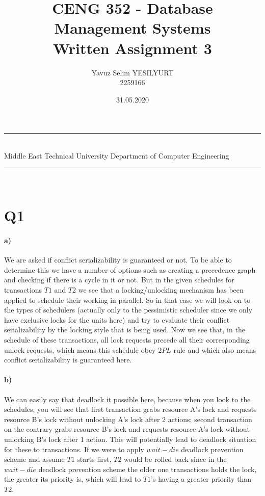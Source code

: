 \documentclass[a4paper,12pt]{article}
\title{CENG 352 - Database Management Systems \\ Written Assignment 3}
\author{Yavuz Selim YESILYURT \\ 2259166} %
\date{31.05.2020}
\newcommand{\HRule}{\rule{\linewidth}{1mm}}
\begin{document}
\HRule\\
Middle East Technical University \hfill Department of Computer Engineering
{\let\newpage\relax\maketitle}
\HRule\\
\vspace{1cm}


\section{Q1}

\paragraph{a)} We are asked if conflict serializability is guaranteed or not. To be able to determine this we have a number of options such as creating a precedence graph and checking if there is a cycle in it or not. But in the given schedules for transactions $T1$ and $T2$ we see that a locking/unlocking mechanism has been applied to schedule their working in parallel. So in that case we will look on to the types of schedulers (actually only to the pessimistic scheduler since we only have exclusive locks for the units here) and try to evaluate their conflict serializability by the locking style that is being used. Now we see that, in the schedule of these transactions, all lock requests precede all their corresponding unlock requests, which means this schedule obey $2PL$ rule and which also means conflict serializability is guaranteed here.

\paragraph{b)} We can easily say that deadlock it possible here, because when you look to the schedules, you will see that first transaction grabs resource A's lock and requests resource B's lock without unlocking A's lock after 2 actions; second transaction on the contrary grabs resource B's lock and requests resource A's lock without unlocking B's lock after 1 action. This will potentially lead to deadlock situation for these to transactions. If we were to apply $wait-die$ deadlock prevention scheme and assume $T1$ starts first, $T2$ would be rolled back since in the $wait-die$ deadlock prevention scheme the older one transactions holds the lock, the greater its priority is, which will lead to $T1$'s having a greater priority than $T2$.
\end{document}
